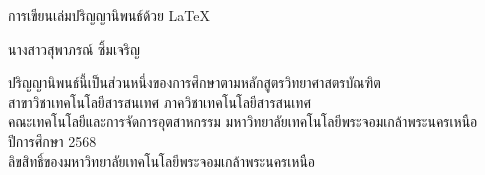 \newpage
\thispagestyle{empty}
\begin{center}


การเขียนเล่มปริญญานิพนธ์ด้วย LaTeX      %


\vspace{90mm}
นางสาวสุพาภรณ์ ซิ้มเจริญ %
\vspace{94mm}   



ปริญญานิพนธ์นี้เป็นส่วนหนึ่งของการศึกษาตามหลักสูตรวิทยาศาสตรบัณฑิต\\
สาขาวิชาเทคโนโลยีสารสนเทศ ภาควิชาเทคโนโลยีสารสนเทศ\\



คณะเทคโนโลยีและการจัดการอุตสาหกรรม มหาวิทยาลัยเทคโนโลยีพระจอมเกล้าพระนครเหนือ\\
ปีการศึกษา 2568\\
ลิขสิทธิ์ของมหาวิทยาลัยเทคโนโลยีพระจอมเกล้าพระนครเหนือ

\end{center}


